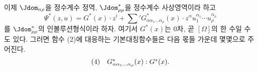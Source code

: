 
이제 $\Jdom_{n\rho}$을 정수계수 정역, $\Jdom^*_{\rho\rho}$을 정수계수 사상영역이라 하고
\[
  \Psi^*(z,u)=G^*(x)\cdot z^i+
  \sum{}'G^*_{\alpha\alpha_1\ldots\alpha_\rho}(x)\cdot
  z^\alpha u_1^{\alpha_1}\cdots u_\rho^{\alpha_\rho}
\]
를 $\Jdom^*_{\rho\rho}$의 인볼루션형식이라 하자. 여기서 $G^*(x)$는 0차, 곧 $[\Omega]$의 한 수일 수도 있다. 그러면 함수 (2)에 대응하는 기본대칭함수들은 다음 몫들 가운데 몇몇으로 주어진다.
\[
\begin{array}{@{}l@{\quad}c@{}}
(4)&
  G^*_{\alpha\alpha_1\ldots\alpha_\rho}(x):G^*(x).
\end{array}
\]
